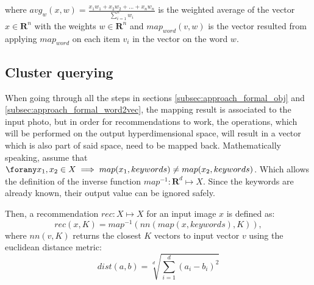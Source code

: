 where $avg_{w}(x, w) = \frac{x_1 w_1 + x_2 w_2 + ... + x_n w_n}{\sum_{i=1}^{n}{w_i}}$ is the weighted average of the vector $x \in \textbf{R}^n$ with the weights $w \in \textbf{R}^n$ and $map_{word} (v, w)$ is the vector resulted from applying $map_{word}$ on each item $v_i$ in the vector on the word $w$.

\subsection{Cluster querying}
\label{subsec:approach_formal_cluster}

When going through all the steps in sections \ref{subsec:approach_formal_obj} and \ref{subsec:approach_formal_word2vec}, the mapping result is associated to the input photo, but in order for recommendations to work, the operations, which will be performed on the output hyperdimensional space, will result in a vector which is also part of said space, need to be mapped back. Mathematically speaking, assume that $\forany x_1, x_2 \in X \implies map(x_1, keywords) \neq map(x_2, keywords)$. Which allows the definition of the inverse function $map^{-1} : \textbf{R}^{d} \mapsto X$. Since the keywords are already known, their output value can be ignored safely.

Then, a recommendation $rec: X \mapsto X$ for an input image $x$ is defined as:
$$rec(x, K) = map^{-1}(nn(map(x, keywords), K)),$$
where $nn(v, K)$ returns the closest $K$ vectors to input vector $v$ using the euclidean distance metric:
$$ dist(a, b) = \sqrt[d]{\sum_{i=1}^{d}{(a_i - b_i)^2}} $$
